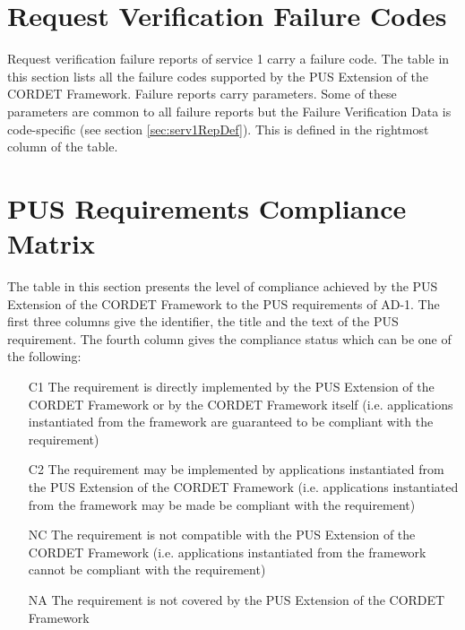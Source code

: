 \documentclass{pnp_article}
\begin{document}
\section{Request Verification Failure Codes}\label{sec:reqVerFailCodes}
Request verification failure reports of service 1 carry a failure code. The table in this section lists all the failure codes supported by the PUS Extension of the CORDET Framework. Failure reports carry parameters. Some of these parameters are common to all failure reports but the Failure Verification Data is code-specific (see section \ref{sec:serv1RepDef}). This is defined in the rightmost column of the table.

\begin{landscape}


\end{landscape}



\section{PUS Requirements Compliance Matrix}\label{sec:PusReqSOC}
The table in this section presents the level of compliance achieved by the PUS Extension of the CORDET Framework to the PUS requirements of AD-1. The first three columns give the identifier, the title and the text of the PUS requirement. The fourth column gives the compliance status which can be one of the following:

\begin{itemize}
\item [C1] The requirement is directly implemented by the PUS Extension of the CORDET Framework or by the CORDET Framework itself (i.e. applications instantiated from the framework are guaranteed to be compliant with the requirement)
\item [C2] The requirement may be implemented by applications instantiated from the PUS Extension of the CORDET Framework (i.e. applications instantiated from the framework may be made be compliant with the requirement)
\item [NC] The requirement is not compatible with the PUS Extension of the CORDET Framework (i.e. applications instantiated from the framework cannot be compliant with the requirement)
\item [NA] The requirement is not covered by the PUS Extension of the CORDET Framework
\end{itemize}
\end{document}
